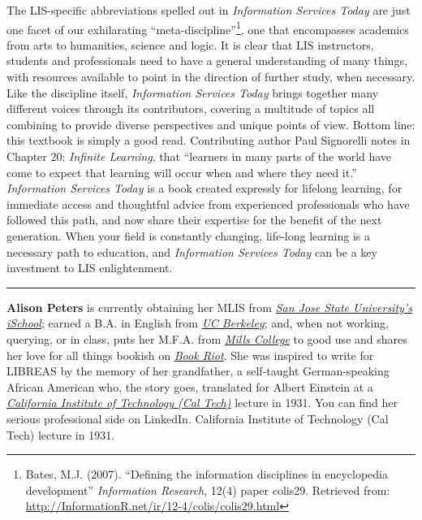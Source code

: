 \documentclass[a4paper,
fontsize=11pt,
oneside,
numbers=noperiodatend,
parskip=half-,
bibliography=totoc,
final
]{scrartcl}
\begin{document}
The LIS-specific abbreviations spelled out in \emph{Information Services
Today} are just one facet of our exhilarating
\enquote{meta-discipline}\footnote{Bates, M.J. (2007). \enquote{Defining
  the information disciplines in encyclopedia development}
  \emph{Information Research}, 12(4) paper colis29. Retrieved from:
  \url{http://InformationR.net/ir/12-4/colis/colis29.html}}, one that
encompasses academics from arts to humanities, science and logic. It is
clear that LIS instructors, students and professionals need to have a
general understanding of many things, with resources available to point
in the direction of further study, when necessary. Like the discipline
itself, \emph{Information Services Today} brings together many different
voices through its contributors, covering a multitude of topics all
combining to provide diverse perspectives and unique points of view.
Bottom line: this textbook is simply a good read. Contributing author
Paul Signorelli notes in Chapter 20: \emph{Infinite Learning}, that
\enquote{learners in many parts of the world have come to expect that
learning will occur when and where they need it.} \emph{Information
Services Today} is a book created expressly for lifelong learning, for
immediate access and thoughtful advice from experienced professionals
who have followed this path, and now share their expertise for the
benefit of the next generation. When your field is constantly changing,
life-long learning is a necessary path to education, and
\emph{Information Services Today} can be a key investment to LIS
enlightenment.

\begin{center}\rule{0.5\linewidth}{\linethickness}\end{center}

\textbf{Alison Peters} is currently obtaining her MLIS from
\href{http://ischool.sjsu.edu/}{\emph{San Jose State University's
iSchool}}; earned a B.A. in English from
\href{http://berkeley.edu/}{\emph{UC Berkeley}}; and, when not working,
querying, or in class, puts her M.F.A. from
\href{http://www.mills.edu/}{\emph{Mills College}} to good use and
shares her love for all things bookish on
\href{http://bookriot.com/}{\emph{Book Riot}}. She was inspired to write
for LIBREAS by the memory of her grandfather, a self-taught
German-speaking African American who, the story goes, translated for
Albert Einstein at a \href{http://www.caltech.edu/}{\emph{California
Institute of Technology (Cal Tech)}} lecture in 1931. You can find her
serious professional side on LinkedIn. California Institute of
Technology (Cal Tech) lecture in 1931.
\end{document}
